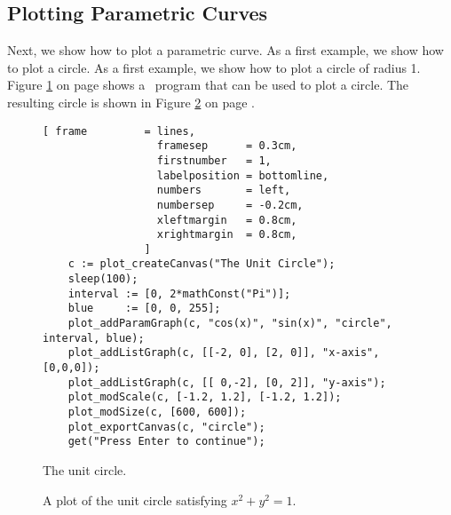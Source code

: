 \subsection{Plotting Parametric Curves}
Next, we show how to plot a parametric curve.  As a first example, we show how to plot a circle.
As a first example, we show how to plot a circle of radius 1.  Figure \ref{fig:circle.stlx} on page
\pageref{fig:circle.stlx} shows a \setlx\ program that can be used to plot a circle.  The resulting
circle is shown in Figure \ref{fig:circle.eps} on page \pageref{fig:circle.eps}.

\begin{figure}[!ht]
\centering
\begin{Verbatim}[ frame         = lines, 
                  framesep      = 0.3cm, 
                  firstnumber   = 1,
                  labelposition = bottomline,
                  numbers       = left,
                  numbersep     = -0.2cm,
                  xleftmargin   = 0.8cm,
                  xrightmargin  = 0.8cm,
                ]
    c := plot_createCanvas("The Unit Circle");
    sleep(100);
    interval := [0, 2*mathConst("Pi")];
    blue     := [0, 0, 255];
    plot_addParamGraph(c, "cos(x)", "sin(x)", "circle", interval, blue);
    plot_addListGraph(c, [[-2, 0], [2, 0]], "x-axis", [0,0,0]);
    plot_addListGraph(c, [[ 0,-2], [0, 2]], "y-axis");
    plot_modScale(c, [-1.2, 1.2], [-1.2, 1.2]);
    plot_modSize(c, [600, 600]);
    plot_exportCanvas(c, "circle");
    get("Press Enter to continue");
\end{Verbatim}
\vspace*{-0.3cm}
\caption{The unit circle.}
\label{fig:circle.stlx}
\end{figure}


\begin{figure}[!ht]
  \centering
  \caption{A plot of the unit circle satisfying  $x^2 + y^2 = 1$.}
  \label{fig:circle.eps}
\end{figure}

